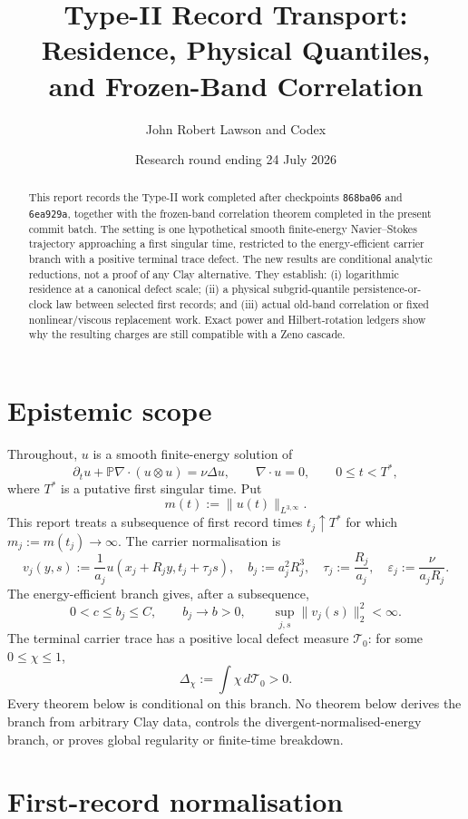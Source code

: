\documentclass[11pt]{article}
\title{Type-II Record Transport: Residence, Physical Quantiles,\\
and Frozen-Band Correlation}
\author{John Robert Lawson and Codex}
\date{Research round ending 24 July 2026}
\theoremstyle{definition}
\theoremstyle{remark}
\newcommand{\eps}{\varepsilon}
\newcommand{\Lweak}{L^{3,\infty}}
\begin{document}
\maketitle

\begin{abstract}
This report records the Type-II work completed after checkpoints
\texttt{868ba06} and \texttt{6ea929a}, together with the frozen-band
correlation theorem completed in the present commit batch.  The setting is
one hypothetical smooth finite-energy Navier--Stokes trajectory approaching
a first singular time, restricted to the energy-efficient carrier branch
with a positive terminal trace defect.  The new results are conditional
analytic reductions, not a proof of any Clay alternative.  They establish:
(i) logarithmic residence at a canonical defect scale; (ii) a physical
subgrid-quantile persistence-or-clock law between selected first records;
and (iii) actual old-band correlation or fixed nonlinear/viscous replacement
work.  Exact power and Hilbert-rotation ledgers show why the resulting
charges are still compatible with a Zeno cascade.
\end{abstract}

\section{Epistemic scope}

Throughout, \(u\) is a smooth finite-energy solution of
\[
 \partial_t u+\mathbb{P}\nabla\!\cdot(u\otimes u)=\nu\Delta u,
 \qquad \nabla\!\cdot u=0,
 \qquad 0\le t<T^*,
\]
where \(T^*\) is a putative first singular time.  Put
\[
 m(t):=\|u(t)\|_{\Lweak}.
\]
This report treats a subsequence of first record times \(t_j\uparrow T^*\)
for which \(m_j:=m(t_j)\to\infty\).  The carrier normalisation is
\[
 v_j(y,s):=\frac1{a_j}
 u(x_j+R_jy,t_j+\tau_js),
 \quad
 b_j:=a_j^2R_j^3,
 \quad
 \tau_j:=\frac{R_j}{a_j},
 \quad
 \eps_j:=\frac{\nu}{a_jR_j}.
\]
The energy-efficient branch gives, after a subsequence,
\[
 0<c\le b_j\le C,
 \qquad b_j\to b>0,
 \qquad
 \sup_{j,s}\|v_j(s)\|_2^2<\infty.
\]
The terminal carrier trace has a positive local defect measure
\(\mathcal{T}_0\): for some \(0\le\chi\le1\),
\[
 \Delta_\chi:=\int\chi\,d\mathcal{T}_0>0.
\]
Every theorem below is conditional on this branch.  No theorem below derives
the branch from arbitrary Clay data, controls the divergent-normalised-energy
branch, or proves global regularity or finite-time breakdown.

\section{First-record normalisation}
\end{document}
